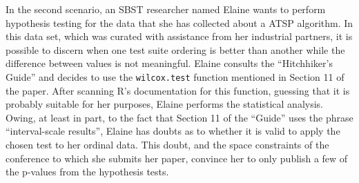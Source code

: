 In the second scenario, an SBST researcher named Elaine wants to perform hypothesis testing for the data that she has
collected about a ATSP algorithm.  In this data set, which was curated with assistance from her industrial partners, it
is possible to discern when one test suite ordering is better than another while the difference between values is not
meaningful. Elaine consults the ``Hitchhiker's Guide'' and decides to use the {\tt wilcox.test} function mentioned in
Section 11 of the paper. After scanning R's documentation for this function, guessing that it is probably suitable for
her purposes, Elaine performs the statistical analysis. Owing, at least in part, to the fact that Section 11 of the
``Guide'' uses the phrase ``interval-scale results'', Elaine has doubts as to whether it is valid to apply the chosen
test to her ordinal data. This doubt, and the space constraints of the conference to which she submits her paper,
convince her to only publish a few of the p-values from the hypothesis tests.


